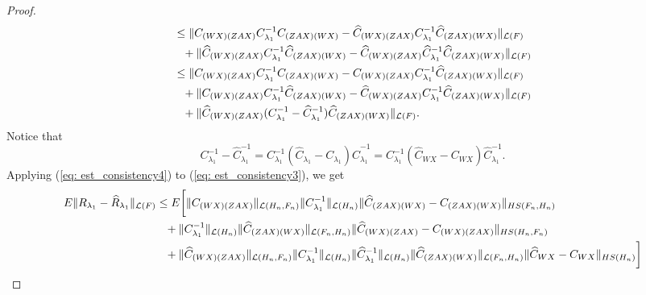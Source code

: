 \begin{proof}
\begin{align}
                                                                        &\leq \|C_{(WX)(ZAX)}C_{\lambda_1}^{-1}C_{(ZAX)(WX)}-\widehat{C}_{(WX)(ZAX)}C_{\lambda_1}^{-1}\widehat{C}_{(ZAX)(WX)}\|_{\mathcal{L}(F)} \notag\\
                                                                        &\phantom{\leq}+ \|\widehat{C}_{(WX)(ZAX)}C_{\lambda_1}^{-1}\widehat{C}_{(ZAX)(WX)}-\widehat{C}_{(WX)(ZAX)}\widehat{C}_{\lambda_1}^{-1}\widehat{C}_{(ZAX)(WX)}\|_{\mathcal{L}(F)} \notag\\ 
                                                                        &\leq \|C_{(WX)(ZAX)}C_{\lambda_1}^{-1}C_{(ZAX)(WX)}-C_{(WX)(ZAX)}C_{\lambda_1}^{-1}\widehat{C}_{(ZAX)(WX)}\|_{\mathcal{L}(F)} \notag\\
                                                                        &\phantom{\leq}+ \|C_{(WX)(ZAX)}C_{\lambda_1}^{-1}\widehat{C}_{(ZAX)(WX)}-\widehat{C}_{(WX)(ZAX)}C_{\lambda_1}^{-1}\widehat{C}_{(ZAX)(WX)}\|_{\mathcal{L}(F)} \notag\\
                                                                        &\phantom{\leq}+ \|\widehat{C}_{(WX)(ZAX)}(C_{\lambda_1}^{-1}-\widehat{C}_{\lambda_1}^{-1})\widehat{C}_{(ZAX)(WX)}\|_{\mathcal{L}(F)}.
    \end{align}
    Notice that
    \begin{equation}
        \label{eq: est_consistency4}
        C_{\lambda_1}^{-1}-\widehat{C}_{\lambda_1}^{-1} = C_{\lambda_1}^{-1}(\widehat{C}_{\lambda_1}-C_{\lambda_1})\widehat{C}_{\lambda_1}^{-1}=C_{\lambda_1}^{-1}(\widehat{C}_{WX}-C_{WX})\widehat{C}_{\lambda_1}^{-1}. 
    \end{equation}
    Applying (\ref{eq: est_consistency4}) to (\ref{eq: est_consistency3}), we get 
    \begin{align}
        \label{eq: est_consistency5}
        E\|R_{\lambda_1}-\widehat{R}_{\lambda_1}\|_{\mathcal{L}(F)} &\leq E\bigg[\|C_{(WX)(ZAX)}\|_{\mathcal{L}(H_n,F_n)}\|C^{-1}_{\lambda_1}\|_{\mathcal{L}(H_n)}\|\widehat{C}_{(ZAX)(WX)}-C_{(ZAX)(WX)}\|_{HS(F_n,H_n)} \notag\\
                                                                        &\phantom{\leq}+ \|C_{\lambda_1}^{-1}\|_{\mathcal{L}(H_n)} \|\widehat{C}_{(ZAX)(WX)}\|_{\mathcal{L}(F_n,H_n)} \|\widehat{C}_{(WX)(ZAX)}-C_{(WX)(ZAX)}\|_{HS(H_n,F_n)} \notag\\
                                                                        &\phantom{\leq}+ \|\widehat{C}_{(WX)(ZAX)}\|_{\mathcal{L}(H_n,F_n)} \|C_{\lambda_1}^{-1}\|_{\mathcal{L}(H_n)} \|\widehat{C}_{\lambda_1}^{-1}\|_{\mathcal{L}(H_n)} \|\widehat{C}_{(ZAX)(WX)}\|_{\mathcal{L}(F_n,H_n)} \|\widehat{C}_{WX}-C_{WX}\|_{HS(H_n)}\bigg] \notag\\

\end{align}
\end{proof}
